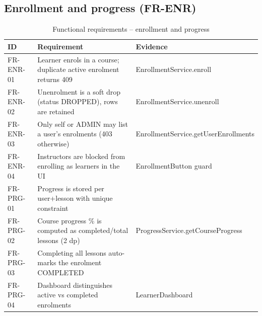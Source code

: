 \subsection{Enrollment and progress (FR-ENR)}
\begin{table}[H]
\centering
\caption{Functional requirements -- enrollment and progress}
\label{tab:fr-enroll}
\begin{tabular}{@{}C{1.5cm}L{8.6cm}L{3.9cm}@{}}
\toprule
\textbf{ID} & \textbf{Requirement} & \textbf{Evidence} \\
\midrule
FR-ENR-01 & Learner enrols in a course; duplicate active enrolment returns 409 & EnrollmentService.enroll \\
FR-ENR-02 & Unenrolment is a soft drop (status DROPPED), rows are retained & EnrollmentService.unenroll \\
FR-ENR-03 & Only self or ADMIN may list a user's enrolments (403 otherwise) & EnrollmentService.getUserEnrollments \\
FR-ENR-04 & Instructors are blocked from enrolling as learners in the UI & EnrollmentButton guard \\
FR-PRG-01 & Progress is stored per user+lesson with unique constraint &  \\
FR-PRG-02 & Course progress \% is computed as completed/total lessons (2 dp) & ProgressService.getCourseProgress \\
FR-PRG-03 & Completing all lessons auto-marks the enrolment COMPLETED &  \\
FR-PRG-04 & Dashboard distinguishes active vs completed enrolments & LearnerDashboard \\
\bottomrule
\end{tabular}
\end{table}

